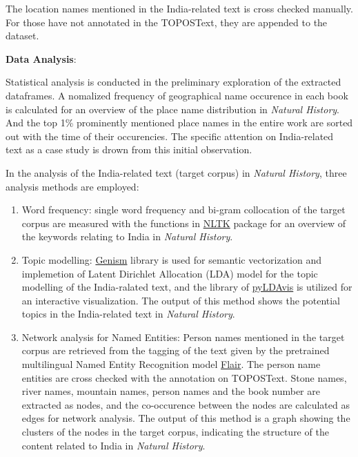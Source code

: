 \documentclass[
  12pt,
]{article}
\begin{document}
The location names mentioned in the India-related text is cross checked
manually. For those have not annotated in the TOPOSText, they are
appended to the dataset.

\textbf{Data Analysis}:

Statistical analysis is conducted in the preliminary exploration of the
extracted dataframes. A nomalized frequency of geographical name
occurence in each book is calculated for an overview of the place name
distribution in \emph{Natural History}. And the top 1\% prominently
mentioned place names in the entire work are sorted out with the time of
their occurencies. The specific attention on India-related text as a
case study is drown from this initial observation.

In the analysis of the India-related text (target corpus) in
\emph{Natural History}, three analysis methods are employed:

\begin{enumerate}
\def\labelenumi{\arabic{enumi}.}
\item
  Word frequency: single word frequency and bi-gram collocation of the
  target corpus are measured with the functions in
  \href{https://www.nltk.org/}{NLTK} package for an overview of the
  keywords relating to India in \emph{Natural History}.
\item
  Topic modelling: \href{https://radimrehurek.com/gensim/}{Genism}
  library is used for semantic vectorization and implemetion of Latent
  Dirichlet Allocation (LDA) model for the topic modelling of the
  India-ralated text, and the library of
  \href{https://pyldavis.readthedocs.io/en/latest/index.htmlgenism}{pyLDAvis}
  is utilized for an interactive visualization. The output of this
  method shows the potential topics in the India-related text in
  \emph{Natural History}.
\item
  Network analysis for Named Entities: Person names mentioned in the
  target corpus are retrieved from the tagging of the text given by the
  pretrained multilingual Named Entity Recognition model
  \href{https://huggingface.co/flair}{Flair}. The person name entities
  are cross checked with the annotation on TOPOSText. Stone names, river
  names, mountain names, person names and the book number are extracted
  as nodes, and the co-occurence between the nodes are calculated as
  edges for network analysis. The output of this method is a graph
  showing the clusters of the nodes in the target corpus, indicating the
  structure of the content related to India in \emph{Natural History}.
\end{enumerate}
\end{document}
